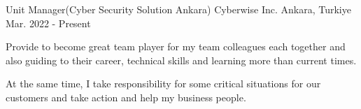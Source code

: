 

\begin{cventries}
  \cventry
    {Unit Manager(Cyber Security Solution Ankara)} %
    {Cyberwise Inc.} %
    {Ankara, Turkiye} %
    {Mar. 2022 - Present} %
    {
      \begin{cvitems} %
        \item {Provide to become great team player for my team colleagues each together and also guiding to their career, technical skills and learning more than current times.}
        \item {At the same time, I take responsibility for some critical situations for our customers and take action and help my business people.}
      \end{cvitems}
    }


\end{cventries}
